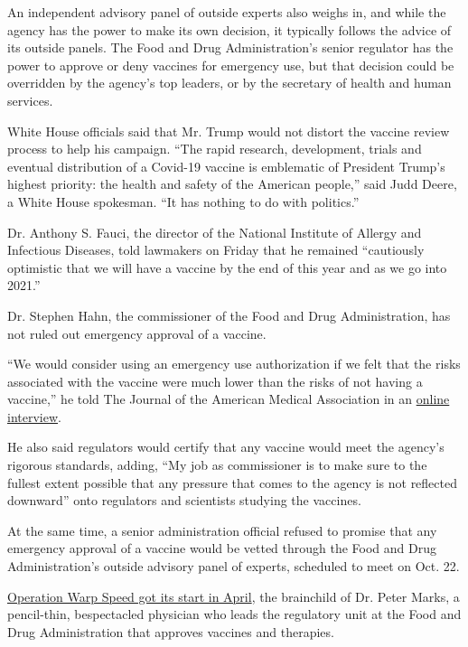 An independent advisory panel of outside experts also weighs in, and
while the agency has the power to make its own decision, it typically
follows the advice of its outside panels. The Food and Drug
Administration's senior regulator has the power to approve or deny
vaccines for emergency use, but that decision could be overridden by the
agency's top leaders, or by the secretary of health and human services.

White House officials said that Mr. Trump would not distort the vaccine
review process to help his campaign. ``The rapid research, development,
trials and eventual distribution of a Covid-19 vaccine is emblematic of
President Trump's highest priority: the health and safety of the
American people,'' said Judd Deere, a White House spokesman. ``It has
nothing to do with politics.''

Dr. Anthony S. Fauci, the director of the National Institute of Allergy
and Infectious Diseases, told lawmakers on Friday that he remained
``cautiously optimistic that we will have a vaccine by the end of this
year and as we go into 2021.''

Dr. Stephen Hahn, the commissioner of the Food and Drug Administration,
has not ruled out emergency approval of a vaccine.

``We would consider using an emergency use authorization if we felt that
the risks associated with the vaccine were much lower than the risks of
not having a vaccine,'' he told The Journal of the American Medical
Association in an
\href{https://www.youtube.com/watch?v=UdmaU2-C_wE\&feature=youtu.be}{online
interview}.

He also said regulators would certify that any vaccine would meet the
agency's rigorous standards, adding, ``My job as commissioner is to make
sure to the fullest extent possible that any pressure that comes to the
agency is not reflected downward'' onto regulators and scientists
studying the vaccines.

At the same time, a senior administration official refused to promise
that any emergency approval of a vaccine would be vetted through the
Food and Drug Administration's outside advisory panel of experts,
scheduled to meet on Oct. 22.

\href{https://www.nytimes3xbfgragh.onion/2020/04/29/us/politics/trump-coronavirus-vaccine-operation-warp-speed.html}{Operation
Warp Speed got its start in April}, the brainchild of Dr. Peter Marks, a
pencil-thin, bespectacled physician who leads the regulatory unit at the
Food and Drug Administration that approves vaccines and therapies.

